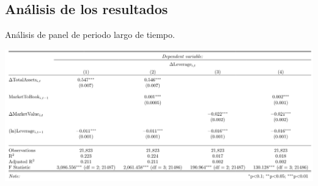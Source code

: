 \documentclass[a4paper,fleqn]{cas-sc}
\begin{document}
\subsection{Análisis de los resultados}
\begin{table}[h]
	\centering
	\caption{Análisis de panel de periodo largo de tiempo.}
	\includegraphics[width=1\textwidth]{tabla5.png}
\end{table}
\end{document}
